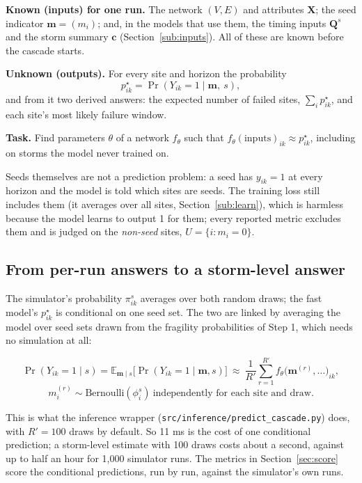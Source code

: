 \documentclass[11pt]{article}
\begin{document}
\begin{askbox}
\textbf{Known (inputs) for one run.} The network $(V,E)$ and attributes $\mathbf X$; the seed indicator $\mathbf m=(m_i)$; and, in the models that use them, the timing inputs $\mathbf Q^s$ and the storm summary $\mathbf c$ (Section~\ref{sub:inputs}). All of these are known before the cascade starts.

\textbf{Unknown (outputs).} For every site and horizon the probability
\[
p^\star_{ik}=\Pr\!\left(Y_{ik}=1\mid \mathbf m,\ s\right),
\]
and from it two derived answers: the expected number of failed sites, $\sum_i p^\star_{ik}$, and each site's most likely failure window.

\textbf{Task.} Find parameters $\theta$ of a network $f_\theta$ such that $f_\theta(\text{inputs})_{ik}\approx p^\star_{ik}$, including on storms the model never trained on.
\end{askbox}

Seeds themselves are not a prediction problem: a seed has $y_{ik}=1$ at every horizon and the model is told which sites are seeds. The training loss still includes them (it averages over all sites, Section~\ref{sub:learn}), which is harmless because the model learns to output 1 for them; every reported metric excludes them and is judged on the \emph{non-seed} sites, $U=\{i:m_i=0\}$.

\subsection{From per-run answers to a storm-level answer}\label{sub:stormlevel}

The simulator's probability $\pi^s_{ik}$ averages over both random draws; the fast model's $p^\star_{ik}$ is conditional on one seed set. The two are linked by averaging the model over seed sets drawn from the fragility probabilities of Step 1, which needs no simulation at all:
\begin{maths}
\[
\Pr(Y_{ik}=1\mid s)=\mathbb E_{\mathbf m\mid s}\big[\Pr(Y_{ik}=1\mid \mathbf m,s)\big]\ \approx\ \frac{1}{R'}\sum_{r=1}^{R'} f_\theta\big(\mathbf m^{(r)},\dots\big)_{ik},
\]
\[
m^{(r)}_i\sim\mathrm{Bernoulli}(\phi_i^s)\ \text{independently for each site and draw.}
\]
\end{maths}
This is what the inference wrapper (\texttt{src/inference/predict\_cascade.py}) does, with $R'=100$ draws by default. So 11 ms is the cost of one conditional prediction; a storm-level estimate with 100 draws costs about a second, against up to half an hour for 1,000 simulator runs. The metrics in Section~\ref{sec:score} score the conditional predictions, run by run, against the simulator's own runs.
\end{document}

